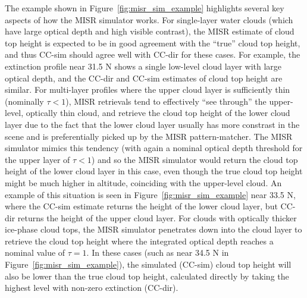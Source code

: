 The example shown in Figure~\ref{fig:misr_sim_example} highlights
several key aspects of how the MISR simulator works. For single-layer
water clouds (which have large optical depth and high visible contrast),
the MISR estimate of cloud top height is expected to be in good
agreement with the ``true'' cloud top height, and thus CC-sim should
agree well with CC-dir for these cases. For example, the extinction
profile near 31.5 N shows a single low-level cloud layer with large
optical depth, and the CC-dir and CC-sim estimates of cloud top height
are similar. For multi-layer profiles where the upper cloud layer is
sufficiently thin (nominally \(\tau < 1\)), MISR retrievals tend to
effectively ``see through'' the upper-level, optically thin cloud, and
retrieve the cloud top height of the lower cloud layer due to the fact
that the lower cloud layer usually has more constrast in the scene and
is preferentially picked up by the MISR pattern-matcher. The MISR
simulator mimics this tendency (with again a nominal optical depth
threshold for the upper layer of \(\tau < 1\)) and so the MISR simulator
would return the cloud top height of the lower cloud layer in this case,
even though the true cloud top height might be much higher in altitude,
coinciding with the upper-level cloud. An example of this situation is
seen in Figure~\ref{fig:misr_sim_example} near 33.5 N, where the CC-sim
estimate returns the height of the lower cloud layer, but CC-dir returns
the height of the upper cloud layer. For clouds with optically thicker
ice-phase cloud tops, the MISR simulator penetrates down into the cloud
layer to retrieve the cloud top height where the integrated optical
depth reaches a nominal value of \(\tau = 1\). In these cases (such as
near 34.5 N in Figure~\ref{fig:misr_sim_example}), the simulated
(CC-sim) cloud top height will also be lower than the true cloud top
height, calculated directly by taking the highest level with non-zero
extinction (CC-dir).

